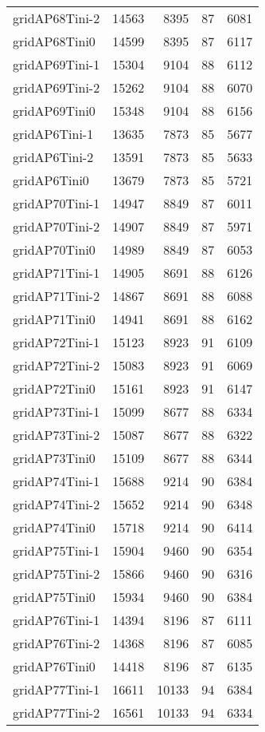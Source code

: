 \begin{longtable}{lrrrr}
gridAP68Tini-2 & 14563 & 8395 & 87 & 6081 \\
gridAP68Tini0 & 14599 & 8395 & 87 & 6117 \\
gridAP69Tini-1 & 15304 & 9104 & 88 & 6112 \\
gridAP69Tini-2 & 15262 & 9104 & 88 & 6070 \\
gridAP69Tini0 & 15348 & 9104 & 88 & 6156 \\
gridAP6Tini-1 & 13635 & 7873 & 85 & 5677 \\
gridAP6Tini-2 & 13591 & 7873 & 85 & 5633 \\
gridAP6Tini0 & 13679 & 7873 & 85 & 5721 \\
gridAP70Tini-1 & 14947 & 8849 & 87 & 6011 \\
gridAP70Tini-2 & 14907 & 8849 & 87 & 5971 \\
gridAP70Tini0 & 14989 & 8849 & 87 & 6053 \\
gridAP71Tini-1 & 14905 & 8691 & 88 & 6126 \\
gridAP71Tini-2 & 14867 & 8691 & 88 & 6088 \\
gridAP71Tini0 & 14941 & 8691 & 88 & 6162 \\
gridAP72Tini-1 & 15123 & 8923 & 91 & 6109 \\
gridAP72Tini-2 & 15083 & 8923 & 91 & 6069 \\
gridAP72Tini0 & 15161 & 8923 & 91 & 6147 \\
gridAP73Tini-1 & 15099 & 8677 & 88 & 6334 \\
gridAP73Tini-2 & 15087 & 8677 & 88 & 6322 \\
gridAP73Tini0 & 15109 & 8677 & 88 & 6344 \\
gridAP74Tini-1 & 15688 & 9214 & 90 & 6384 \\
gridAP74Tini-2 & 15652 & 9214 & 90 & 6348 \\
gridAP74Tini0 & 15718 & 9214 & 90 & 6414 \\
gridAP75Tini-1 & 15904 & 9460 & 90 & 6354 \\
gridAP75Tini-2 & 15866 & 9460 & 90 & 6316 \\
gridAP75Tini0 & 15934 & 9460 & 90 & 6384 \\
gridAP76Tini-1 & 14394 & 8196 & 87 & 6111 \\
gridAP76Tini-2 & 14368 & 8196 & 87 & 6085 \\
gridAP76Tini0 & 14418 & 8196 & 87 & 6135 \\
gridAP77Tini-1 & 16611 & 10133 & 94 & 6384 \\
gridAP77Tini-2 & 16561 & 10133 & 94 & 6334 \\

\end{longtable}
